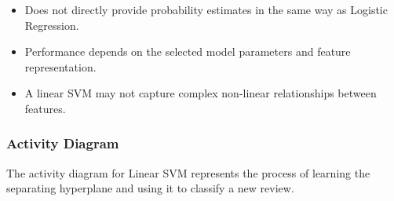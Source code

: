 \documentclass[12pt,a4paper]{report}
\begin{document}
\begin{itemize}
    \item Does not directly provide probability estimates in the same way as Logistic Regression.
    \item Performance depends on the selected model parameters and feature representation.
    \item A linear SVM may not capture complex non-linear relationships between features.
\end{itemize}

\subsubsection*{Activity Diagram}

The activity diagram for Linear SVM represents the process of learning the separating hyperplane and using it to classify a new review.
\end{document}
